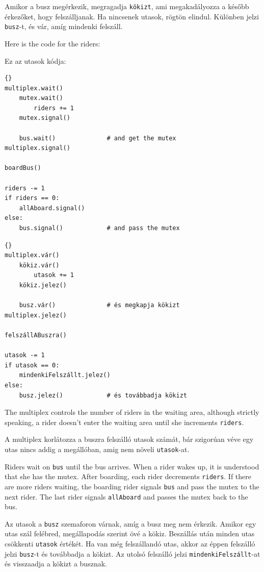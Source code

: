 \documentclass{book}
\begin{document}
Amikor a busz megérkezik, megragadja {\tt kökizt}, ami megakadályozza
a később érkezőket, hogy felszálljanak. Ha nincsenek utasok, rögtön
elindul. Különben jelzi {\tt busz}-t, és vár, amíg mindenki
felszáll.

Here is the code for the riders:

Ez az utasok kódja:

\begin{lstlisting}[title={Bus problem solution (riders)}]{}
multiplex.wait()
    mutex.wait()
        riders += 1
    mutex.signal()

    bus.wait()              # and get the mutex
multiplex.signal()

boardBus()

riders -= 1
if riders == 0:
    allAboard.signal() 
else:
    bus.signal()            # and pass the mutex
\end{lstlisting}

\begin{lstlisting}[title={Egyetemi buszjárat megoldás (utasok)}]{}
multiplex.vár()
    kökiz.vár()
        utasok += 1
    kökiz.jelez()

    busz.vár()              # és megkapja kökizt
multiplex.jelez()

felszállABuszra()

utasok -= 1
if utasok == 0:
    mindenkiFelszállt.jelez() 
else:
    busz.jelez()            # és továbbadja kökizt
\end{lstlisting}

The multiplex controls the number of riders in the waiting area,
although strictly speaking, a rider doesn't enter the waiting
area until she increments {\tt riders}.

A multiplex korlátozza a buszra felszálló utasok számát, bár
szigorúan véve egy utas nincs addig a megállóban, amig
nem növeli {\tt utasok}-at.

Riders wait on {\tt bus} until the bus arrives.  When a rider
wakes up, it is understood that she has the mutex.
After boarding, each rider decrements {\tt riders}.  If there
are more riders waiting, the boarding rider signals {\tt bus}
and pass the mutex to the next rider.  The last rider signals
{\tt allAboard} and passes the mutex back to the bus.

Az utasok a {\tt busz} szemaforon várnak, amíg a busz meg nem érkezik.
Amikor egy utas szál felébred, megállapodás szerint övé a kökiz.
Beszállás után minden utas csökkenti {\tt utasok} értékét.
Ha van még felszállandó utas, akkor az éppen felszálló jelzi
{\tt busz}-t és továbbadja a kökizt. Az utolsó felszálló
jelzi {\tt mindenkiFelszállt}-at és visszaadja a kökizt a busznak.
\end{document}
